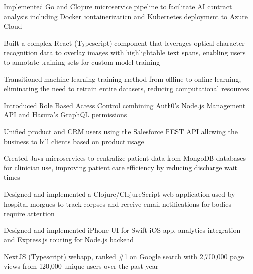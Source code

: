 \documentclass[]{resume}
\begin{document}
\begin{minipage}[t]{0.70\textwidth}
\begin{tightemize}
\item Implemented Go and Clojure microservice pipeline to facilitate AI contract analysis including Docker containerization and Kubernetes deployment to Azure Cloud
\item Built a complex React (Typescript) component that leverages optical character recognition data to overlay images with highlightable text spans, enabling users to annotate training sets for custom model training
\item Transitioned machine learning training method from offline to online learning, eliminating the need to retrain entire datasets, reducing computational resources
\item Introduced Role Based Access Control combining Auth0's Node.js Management API and Hasura's GraphQL permissions
\item Unified product and CRM users using the Salesforce REST API allowing the business to bill clients based on product usage
\end{tightemize}
\separatorM

\begin{tightemize}
\item Created Java microservices to centralize patient data from MongoDB databases for clinician use, improving patient care efficiency by reducing discharge wait times
\item Designed and implemented a Clojure/ClojureScript web application used by hospital morgues to track corpses and receive email notifications for bodies require attention
\end{tightemize}
\separatorM

\begin{tightemize}
\item Designed and implemented iPhone UI for Swift iOS app, analytics integration and Express.js routing for Node.js backend
\end{tightemize}
\separatorS
 

 \hfill {}
\begin{tightemize}
\item NextJS (Typescript) webapp, ranked \#1 on Google search with 2,700,000 page views from 120,000 unique users over the past year
\end{tightemize}


 
\end{minipage} 
\end{document}
